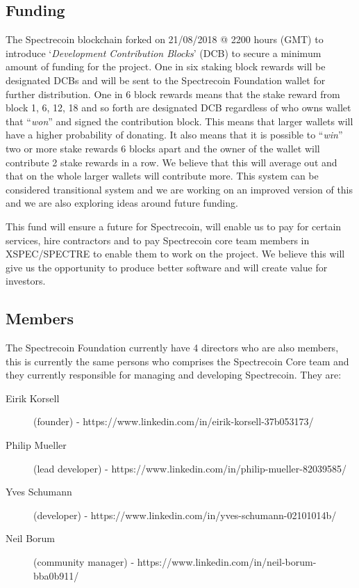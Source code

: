 \subsection{Funding}
The Spectrecoin blockchain forked on 21/08/2018 @ 2200 hours (GMT) to
introduce ‘\textit{Development Contribution Blocks}’ (DCB) to secure a
minimum amount of funding for the project. One in six staking block rewards
will be designated DCBs and will be sent to the Spectrecoin Foundation
wallet for further distribution. One in 6 block rewards means that the
stake reward from block 1, 6, 12, 18 and so forth are designated DCB
regardless of who owns wallet that “\textit{won}” and signed the
contribution block. This means that larger wallets will have a higher
probability of donating. It also means that it is possible to
“\textit{win}” two or more stake rewards 6 blocks apart and the owner
of the wallet will contribute 2 stake rewards in a row. We believe that
this will average out and that on the whole larger wallets will contribute
more. This system can be considered transitional system and we are working
on an improved version of this and we are also exploring ideas around
future funding.



This fund will ensure a future for Spectrecoin, will enable us to pay for
certain services, hire contractors and to pay Spectrecoin core team members
in XSPEC/SPECTRE to enable them to work on the project. We believe this
will give us the opportunity to produce better software and will create
value for investors.



\subsection{Members}
The Spectrecoin Foundation currently have 4 directors who are also members,
this is currently the same persons who comprises the Spectrecoin Core team
and they currently responsible for managing and developing Spectrecoin.
They are:



\begin{description}
	\item[Eirik Korsell]  (founder) - https://www.linkedin.com/in/eirik-korsell-37b053173/
	\item[Philip Mueller] (lead developer) - https://www.linkedin.com/in/philip-mueller-82039585/
	\item[Yves Schumann] (developer) - https://www.linkedin.com/in/yves-schumann-02101014b/
	\item[Neil Borum] (community manager) - https://www.linkedin.com/in/neil-borum-bba0b911/
\end{description}



